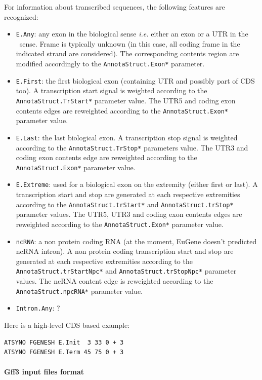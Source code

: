 For information about transcribed sequences, the following features
are recognized:
\begin{itemize}
\item \texttt{E.Any}: any exon in the biological sense \textit{i.e.}
  either an exon or a UTR in the \EuGene\ sense. Frame is typically
  unknown (in this case, all coding frame in the indicated strand are
  considered). The corresponding contents region are modified
  accordingly to the \texttt{AnnotaStruct.Exon*} parameter.
\item \texttt{E.First}: the first biological exon (containing UTR and
  possibly part of CDS too). A transcription start signal is weighted
  according to the \texttt{AnnotaStruct.TrStart*} parameter value. The
  UTR5 and coding exon contents edges are reweighted according to the
  \texttt{AnnotaStruct.Exon*} parameter value.
\item \texttt{E.Last}: the last biological exon. A transcription stop
  signal is weighted according to the \texttt{Annota\-Struct.TrStop*}
  parameters value. The UTR3 and coding exon contents edge are
  reweighted according to the \texttt{AnnotaStruct.Exon*} parameter
  value.
\item \texttt{E.Extreme}: used for a biological exon on the extremity
  (either first or last).  A transcription start and stop are
  generated at each respective extremities according to the
  \texttt{AnnotaStruct.trStart*} and \texttt{AnnotaStruct.trStop*}
  parameter values. The UTR5, UTR3 and coding exon contents edges are
  reweighted according to the \texttt{AnnotaStruct.Exon*} parameter
  value.
\item \texttt{ncRNA}: a non protein coding RNA (at the moment, EuGene doesn't 
predicted ncRNA intron). A non protein coding transcription start and stop are
  generated at each respective extremities according to the
  \texttt{AnnotaStruct.trStartNpc*} and \texttt{AnnotaStruct.trStopNpc*}
  parameter values. The ncRNA content edge is
  reweighted according to the \texttt{AnnotaStruct.npcRNA*} parameter
  value.
\item \texttt{Intron.Any}: ?
\end{itemize}


Here is a high-level CDS based example:
\begin{Verbatim}[fontsize=\small]
ATSYNO FGENESH E.Init  3 33 0 + 3
ATSYNO FGENESH E.Term 45 75 0 + 3
\end{Verbatim}

\paragraph{Gff3 input files format}

